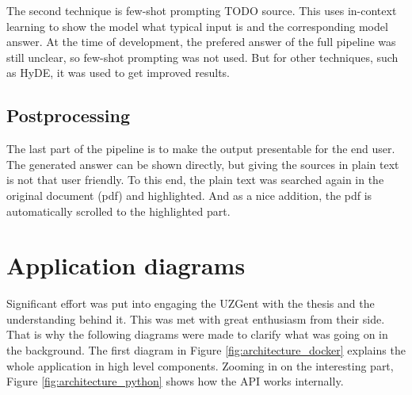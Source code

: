 The second technique is few-shot prompting TODO source. This uses in-context learning to show the model what typical input is and the corresponding model answer. At the time of development, the prefered answer of the full pipeline was still unclear, so few-shot prompting was not used. But for other techniques, such as HyDE, it was used to get improved results. 

\subsection{Postprocessing}
The last part of the pipeline is to make the output presentable for the end user. The generated answer can be shown directly, but giving the sources in plain text is not that user friendly. To this end, the plain text was searched again in the original document (pdf) and highlighted. And as a nice addition, the pdf is automatically scrolled to the highlighted part.

\section{Application diagrams}
Significant effort was put into engaging the UZGent with the thesis and the understanding behind it. This was met with great enthusiasm from their side. That is why the following diagrams were made to clarify what was going on in the background. The first diagram in Figure \ref{fig:architecture_docker} explains the whole application in high level components. Zooming in on the interesting part, Figure \ref{fig:architecture_python} shows how the API works internally.

